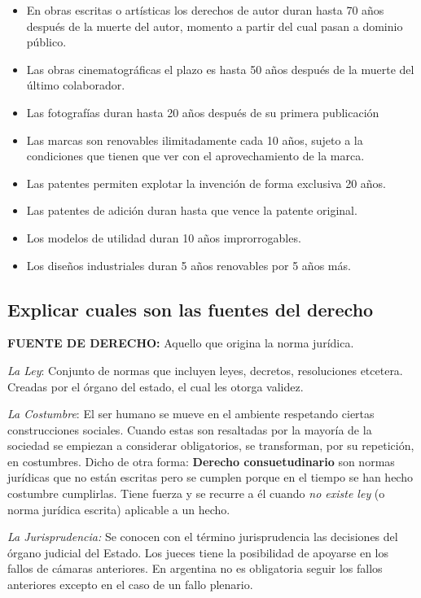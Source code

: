 \documentclass{article}
\begin{document}
\begin{itemize}
\item En  obras escritas o artísticas los derechos de autor duran hasta 70 años después de la muerte del autor, momento a partir del cual pasan a dominio público.
\item  Las obras cinematográficas el plazo es hasta 50 años después de la muerte del último colaborador. 
\item Las fotografías duran hasta 20 años después de su primera publicación
\item Las marcas son renovables ilimitadamente cada 10 años, sujeto a la condiciones que tienen que ver con el aprovechamiento de la marca.
\item Las patentes permiten explotar la invención de forma exclusiva 20 años. 
\item Las patentes de adición duran hasta que vence la patente original.
\item Los modelos de utilidad duran 10 años improrrogables.
\item Los diseños industriales duran 5 años renovables por 5 años más.
\end{itemize}

\subsection{Explicar cuales son las fuentes del derecho}
\label{sec:FuentesDeDerechoExplicadas}
\textbf{FUENTE DE DERECHO:} Aquello que origina la norma jurídica.

\textit{La Ley}: Conjunto de normas que incluyen leyes, decretos, resoluciones etcetera. Creadas por el órgano del estado, el cual les otorga validez.

\textit{La Costumbre}: El ser humano se mueve en el ambiente respetando ciertas construcciones sociales. Cuando estas son resaltadas por la mayoría de la sociedad se empiezan a considerar obligatorios, se transforman, por su repetición, en costumbres. Dicho de otra forma:  \textbf{Derecho consuetudinario} son normas jurídicas que no están escritas pero se cumplen porque en el tiempo se han hecho costumbre cumplirlas. Tiene fuerza y se recurre a él cuando \textit{no existe ley} (o norma jurídica escrita) aplicable a un hecho.

\textit{La Jurisprudencia:} Se conocen con el término jurisprudencia las decisiones del órgano judicial del Estado. Los jueces tiene la posibilidad de apoyarse en los fallos de cámaras anteriores. En argentina no es obligatoria seguir los fallos anteriores excepto en el caso de un fallo plenario.
\end{document}
